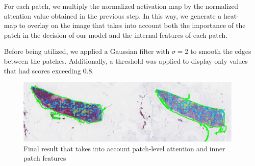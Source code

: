 \documentclass{article}
\begin{document}
For each patch, we multiply the normalized activation map by the normalized attention value obtained in the previous step. In this way, we generate a heat-map to overlay on the image that takes into account both the importance of the patch in the decision of our model and the internal features of each patch.

Before being utilized, we applied a Gaussian filter with $\sigma =2$ to smooth the edges between the patches. Additionally, a threshold was applied to display only values that had scores exceeding $0.8$.
 
\begin{figure}[h]
	\centering
	\includegraphics[width=1\textwidth]{images/attention_map_val.png}
	\caption{Final result that takes into account patch-level attention and inner patch features}
\end{figure}

\newpage
\end{document}
